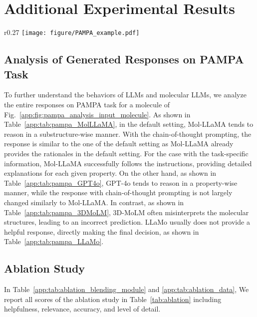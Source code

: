 
\newpage


\section{Additional Experimental Results\label{app:sec:additional_experiments}}

\begin{wrapfigure}{r}{0.27\textwidth}
    \vspace{-0.1in}
    \centering
    \hspace{-0.4in}\texttt{[image: figure/PAMPA\_example.pdf]}
    \vspace{-0.1in}
    \caption{Input molecule}
    \label{app:fig:pampa_analysis_input_molecule}
\end{wrapfigure}
\subsection{Analysis of Generated Responses on PAMPA Task\label{app:sec:additional_pampa}}
To further understand the behaviors of LLMs and molecular LLMs, we analyze the entire responses on PAMPA task for a molecule of Fig.~\ref{app:fig:pampa_analysis_input_molecule}. As shown in Table~\ref{app:tab:pampa_MolLLaMA}, in the default setting, Mol-LLaMA tends to reason in a substructure-wise manner. With the chain-of-thought prompting, the response is similar to the one of the default setting as Mol-LLaMA already provides the rationales in the default setting. For the case with the task-specific information, Mol-LLaMA successfully follows the instructions, providing detailed explanations for each given property. On the other hand, as shown in Table~\ref{app:tab:pampa_GPT4o}, GPT-4o tends to reason in a property-wise manner, while the response with chain-of-thought prompting is not largely changed similarly to Mol-LLaMA. In contrast, as shown in Table~\ref{app:tab:pampa_3DMoLM}, 3D-MoLM often misinterprets the molecular structures, leading to an incorrect prediction. LLaMo usually does not provide a helpful response, directly making the final decision, as shown in Table~\ref{app:tab:pampa_LLaMo}.

\subsection{Ablation Study\label{app:sec:additional_ablation_study}}
In Table~\ref{app:tab:ablation_blending_module} and \ref{app:tab:ablation_data}, We report all scores of the ablation study in Table~\ref{tab:ablation} including helpfulness, relevance, accuracy, and level of detail.

